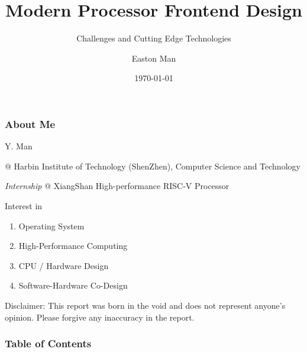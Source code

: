 \documentclass[aspectratio=169]{beamer}
\title{Modern Processor Frontend Design}
\subtitle{Challenges and Cutting Edge Technologies}
\author{Easton Man}
\institute[HITSZ]{Harbin Institute of Technology (ShenZhen)}
\date{\today}
\begin{document}
\frame{\titlepage}

\begin{frame}
    \frametitle{About Me}

    Y. Man

    @ Harbin Institute of Technology (ShenZhen), Computer Science and Technology

    \emph{Internship} @ XiangShan High-performance RISC-V Processor

    \vspace{1em}

    Interest in
    \begin{enumerate}
        \item Operating System
        \item High-Performance Computing
        \item CPU / Hardware Design
        \item Software-Hardware Co-Design
    \end{enumerate}

    \vspace{2em}

    {\footnotesize Disclaimer: This report was born in the void and does not represent anyone's opinion. Please forgive any inaccuracy in the report.
    }

\end{frame}

\begin{frame}
    \frametitle{Table of Contents}
    \tableofcontents
\end{frame}


\end{document}
